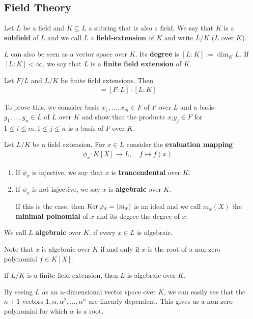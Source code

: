 \subsection{Field Theory}

\begin{dfn}[]
  Let $L$ be a field and $K \subseteq L$ a subring that is also a field. We say that $K$ is a \textbf{subfield} of $L$ and we call $L$ a \textbf{field-extension} of $K$ and write $L/K$ ($L$ over $K$).

  $L$ can also be seen as a vector space over $K$. Its \textbf{degree} is $[L:K] := \dim_K L$.
  If $[L:K] < \infty$, we say that $L$ is a \textbf{finite field extension} of $K$.
\end{dfn}

\begin{lem}[]
  Let $F/L$ and $L/K$ be finite field extensions. Then
  \begin{align*}
    [F:K] = [F:L] \cdot [L:K]
  \end{align*}
\end{lem}
To prove this, we consider basis $x_1, \ldots, x_m \in F$ of $F$ over $L$ and a basis $y_{1}, \ldots, y_{n} \in L$ of $L$ over $K$ and show that the products $x_iy_j \in F$ for $1 \leq i \leq m, 1 \leq j \leq n$ is a basis of $F$ over $K$.


\begin{dfn}[]
  Let $L/K$ be a field extension. For $x \in L$ consider the \textbf{evaluation mapping}
  \begin{align*}
    \phi_x: K[X] \to L,\quad f \mapsto  f(x)
  \end{align*}
  \begin{enumerate}
    \item If $\phi_x$ is injective, we say that $x$ is \textbf{trancendental} over $K$.
    \item If $\phi_x$ is not injective, we say $x$ is \textbf{algebraic} over $K$.
      
      If this is the case, then $\operatorname{Ker} \varphi_x = (m_x)$ is an ideal and we call $m_x(X)$ the \textbf{minimal polnomial} of $x$ and its degree the degree of $x$.
  \end{enumerate}
  We call $L$ \textbf{algebraic} over $K$, if every $x \in L$ is algebraic.
\end{dfn}
Note that $x$ is algebraic over $K$ if and only if $x$ is the root of a non-zero polynomial $f \in K[X]$.

\begin{prop}[]
  If $L/K$ is a finite field extension, then $L$ is algebraic over $K$.
\end{prop}
By seeing $L$ as an $n$-dimensional vector space over $K$, we can easily see that the $n+1$ vectors $1, \alpha, \alpha^{2}, \ldots, \alpha^{n}$ are linearly dependent. This gives us a non-zero polynomial for which $\alpha$ is a root.

